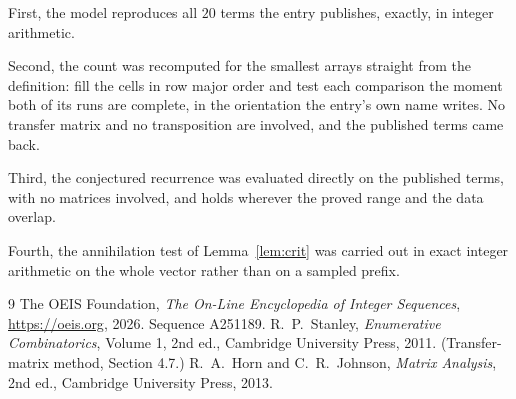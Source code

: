 \documentclass[11pt,a4paper]{article}
\theoremstyle{plain}
\theoremstyle{definition}
\begin{document}
First, the model reproduces all $20$ terms the entry publishes, exactly, in integer
arithmetic.

Second, the count was recomputed for the smallest arrays straight from the definition: fill the
cells in row major order and test each comparison the moment both of its runs are complete,
in the orientation the entry's own name writes. No transfer matrix and no transposition are
involved, and the published terms came back.

Third, the conjectured recurrence was evaluated directly on the published terms, with no
matrices involved, and holds wherever the proved range and the data overlap.

Fourth, the annihilation test of Lemma~\ref{lem:crit} was carried out in exact integer
arithmetic on the whole vector rather than on a sampled prefix.

\begin{thebibliography}{9}
 The OEIS Foundation, \emph{The On-Line Encyclopedia of Integer
Sequences}, \url{https://oeis.org}, 2026. Sequence A251189.
 R.~P.~Stanley, \emph{Enumerative Combinatorics}, Volume 1, 2nd ed.,
Cambridge University Press, 2011. (Transfer-matrix method, Section 4.7.)
 R.~A.~Horn and C.~R.~Johnson, \emph{Matrix Analysis}, 2nd ed., Cambridge
University Press, 2013.
\end{thebibliography}
\end{document}
